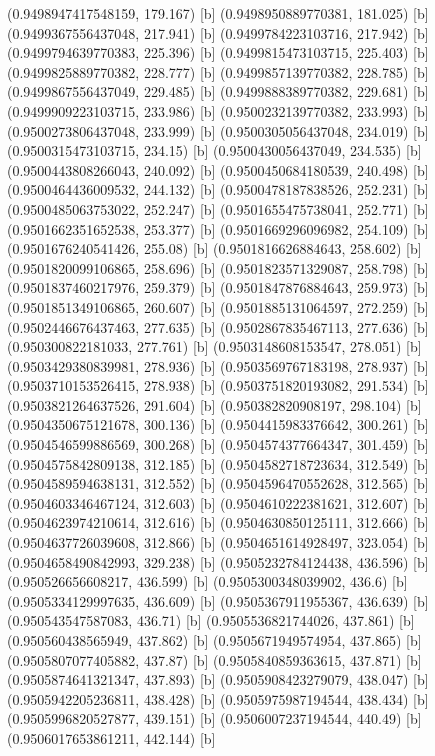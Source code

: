 {{{(0.9498947417548159, 179.167) [b] 
(0.9498950889770381, 181.025) [b] 
(0.9499367556437048, 217.941) [b] 
(0.9499784223103716, 217.942) [b] 
(0.9499794639770383, 225.396) [b] 
(0.9499815473103715, 225.403) [b] 
(0.9499825889770382, 228.777) [b] 
(0.9499857139770382, 228.785) [b] 
(0.9499867556437049, 229.485) [b] 
(0.9499888389770382, 229.681) [b] 
(0.9499909223103715, 233.986) [b] 
(0.9500232139770382, 233.993) [b] 
(0.9500273806437048, 233.999) [b] 
(0.9500305056437048, 234.019) [b] 
(0.9500315473103715, 234.15) [b] 
(0.9500430056437049, 234.535) [b] 
(0.9500443808266043, 240.092) [b] 
(0.9500450684180539, 240.498) [b] 
(0.9500464436009532, 244.132) [b] 
(0.9500478187838526, 252.231) [b] 
(0.9500485063753022, 252.247) [b] 
(0.9501655475738041, 252.771) [b] 
(0.9501662351652538, 253.377) [b] 
(0.9501669296096982, 254.109) [b] 
(0.9501676240541426, 255.08) [b] 
(0.9501816626884643, 258.602) [b] 
(0.9501820099106865, 258.696) [b] 
(0.9501823571329087, 258.798) [b] 
(0.9501837460217976, 259.379) [b] 
(0.9501847876884643, 259.973) [b] 
(0.9501851349106865, 260.607) [b] 
(0.9501885131064597, 272.259) [b] 
(0.9502446676437463, 277.635) [b] 
(0.9502867835467113, 277.636) [b] 
(0.950300822181033, 277.761) [b] 
(0.9503148608153547, 278.051) [b] 
(0.9503429380839981, 278.936) [b] 
(0.9503569767183198, 278.937) [b] 
(0.9503710153526415, 278.938) [b] 
(0.9503751820193082, 291.534) [b] 
(0.9503821264637526, 291.604) [b] 
(0.950382820908197, 298.104) [b] 
(0.9504350675121678, 300.136) [b] 
(0.9504415983376642, 300.261) [b] 
(0.9504546599886569, 300.268) [b] 
(0.9504574377664347, 301.459) [b] 
(0.9504575842809138, 312.185) [b] 
(0.9504582718723634, 312.549) [b] 
(0.9504589594638131, 312.552) [b] 
(0.9504596470552628, 312.565) [b] 
(0.9504603346467124, 312.603) [b] 
(0.9504610222381621, 312.607) [b] 
(0.9504623974210614, 312.616) [b] 
(0.9504630850125111, 312.666) [b] 
(0.9504637726039608, 312.866) [b] 
(0.9504651614928497, 323.054) [b] 
(0.9504658490842993, 329.238) [b] 
(0.9505232784124438, 436.596) [b] 
(0.950526656608217, 436.599) [b] 
(0.9505300348039902, 436.6) [b] 
(0.9505334129997635, 436.609) [b] 
(0.9505367911955367, 436.639) [b] 
(0.950543547587083, 436.71) [b] 
(0.9505536821744026, 437.861) [b] 
(0.950560438565949, 437.862) [b] 
(0.9505671949574954, 437.865) [b] 
(0.9505807077405882, 437.87) [b] 
(0.9505840859363615, 437.871) [b] 
(0.9505874641321347, 437.893) [b] 
(0.9505908423279079, 438.047) [b] 
(0.9505942205236811, 438.428) [b] 
(0.9505975987194544, 438.434) [b] 
(0.9505996820527877, 439.151) [b] 
(0.9506007237194544, 440.49) [b] 
(0.9506017653861211, 442.144) [b] 
}}}
